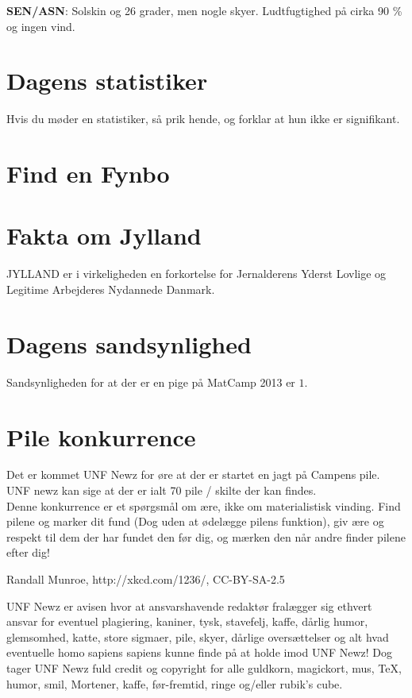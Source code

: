 \begin{minipage}[b]{0.95\linewidth}
\begin{minipage}[t]{0.47\textwidth}
\textbf{SEN/ASN}: Solskin og 26 grader, men nogle skyer. Ludtfugtighed på cirka 90 \% og ingen vind.

\vspace{-2mm}
\section*{Dagens statistiker}
Hvis du møder en statistiker, så prik hende, og forklar at hun ikke er signifikant.

\vspace{-2mm}
\section*{Find en Fynbo}

\vspace{-2mm}
\section*{Fakta om Jylland}
JYLLAND er i virkeligheden en forkortelse for Jernalderens Yderst Lovlige og Legitime Arbejderes Nydannede Danmark.

\vspace{-2mm}
\section*{Dagens sandsynlighed}
Sandsynligheden for at der er en pige på MatCamp 2013 er $1$.

\vspace{-2mm}
\section*{Pile konkurrence}
Det er kommet UNF Newz for øre at der er startet en jagt på Campens pile. UNF newz kan sige at der er ialt 70 pile / skilte der kan findes. \\
Denne konkurrence er et spørgsmål om ære, ikke om materialistisk vinding. Find pilene og marker dit fund (Dog uden at ødelægge pilens funktion), giv ære og respekt til dem der har fundet den før dig, og mærken den når andre finder pilene efter dig!

\vspace{1mm}
\tiny Randall Munroe, http://xkcd.com/1236/, CC-BY-SA-2.5
\end{minipage}

\begin{center}
\tiny UNF Newz er avisen hvor at ansvarshavende redaktør fralægger sig ethvert ansvar for eventuel plagiering, kaniner, tysk, stavefelj, kaffe, dårlig humor, glemsomhed, katte, store sigmaer, pile, skyer, dårlige oversættelser og alt hvad eventuelle homo sapiens sapiens kunne finde på at holde imod UNF Newz! Dog tager UNF Newz fuld credit og copyright for alle guldkorn, magickort, mus, \TeX, humor, smil, Mortener, kaffe, før-fremtid, ringe og/eller rubik's cube.
\end{center}
\end{minipage}

